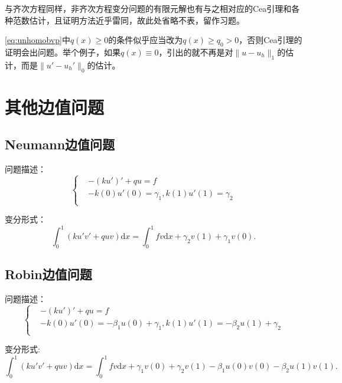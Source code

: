 \documentclass[lang=cn,10pt,newtx]{elegantbook}
\newcommand{\dif}{\mathrm{d}}
\newcommand{\norm}[1]{\|#1\|}
\begin{document}
与齐次方程同样，非齐次方程变分问题的有限元解也有与之相对应的Cea引理和各种范数估计，且证明方法近乎雷同，故此处省略不表，留作习题。

\begin{remark}
  \eqref{eq:unhomobvp}中$q(x)\ge 0$的条件似乎应当改为$q(x)\ge q_{0}>0$，否则Cea引理的证明会出问题。举个例子，如果$q(x)\equiv 0$，引出的就不再是对$\norm{u-u_{h}}_{1}$的估计，而是$\norm{u'-u_{h}'}_{0}$的估计。
\end{remark}
\section{其他边值问题}
\subsection{Neumann边值问题}
问题描述：
\begin{equation}
  \label{eq:Neumann}
  \left\{
    \begin{aligned}
    &-(ku')'+qu=f\\
    &-k(0)u'(0)=\gamma_{1},k(1)u'(1)=\gamma_{2}\\
    \end{aligned}
  \right.
\end{equation}

变分形式：
\begin{equation}
  \int_{0}^{1}(ku'v'+quv)\dif x=\int_{0}^{1}fv\dif x+\gamma_{2}v(1)+\gamma_{1}v(0).
\end{equation}
\subsection{Robin边值问题}
问题描述：
\begin{equation}
  \label{eq:Robin}
  \left\{
    \begin{aligned}
    &-(ku')'+qu=f\\
    &-k(0)u'(0)=-\beta_{1}u(0)+\gamma_{1},k(1)u'(1)=-\beta_{2}u(1)+\gamma_{2}\\
    \end{aligned}
  \right.
\end{equation}

变分形式:
\begin{equation}
  \int_{0}^{1}(ku'v'+quv)\dif x=\int_{0}^{1}fv\dif x+\gamma_{1}v(0)+\gamma_{2}v(1)-\beta_{1}u(0)v(0)-\beta_{2}u(1)v(1).
\end{equation}
\end{document}

